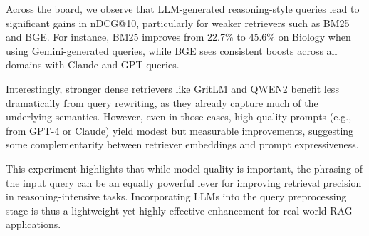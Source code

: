 \documentclass[11pt]{article}
\begin{document}
Across the board, we observe that LLM-generated reasoning-style queries lead to significant gains in nDCG@10, particularly for weaker retrievers such as BM25 and BGE. For instance, BM25 improves from 22.7\% to 45.6\% on Biology when using Gemini-generated queries, while BGE sees consistent boosts across all domains with Claude and GPT queries.

Interestingly, stronger dense retrievers like GritLM and QWEN2 benefit less dramatically from query rewriting, as they already capture much of the underlying semantics. However, even in those cases, high-quality prompts (e.g., from GPT-4 or Claude) yield modest but measurable improvements, suggesting some complementarity between retriever embeddings and prompt expressiveness.

This experiment highlights that while model quality is important, the phrasing of the input query can be an equally powerful lever for improving retrieval precision in reasoning-intensive tasks. Incorporating LLMs into the query preprocessing stage is thus a lightweight yet highly effective enhancement for real-world RAG applications.
\end{document}
